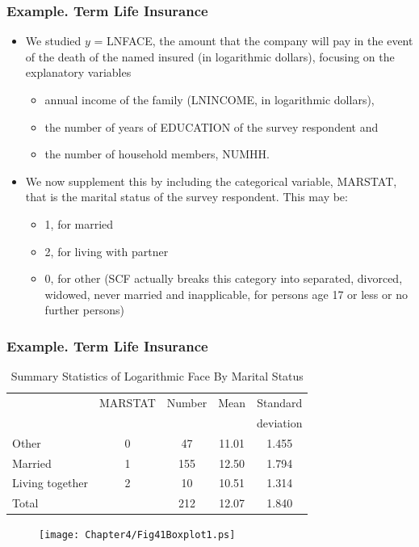 \begin{frame}
 \frametitle{Example. Term Life Insurance}
 \begin{itemize}
   \item We studied $y$ = LNFACE, the amount that the company will pay in the event
of the death of the named insured (in logarithmic dollars), focusing
on the explanatory variables
 \begin{itemize}
 \item
annual income of the family (LNINCOME, in logarithmic dollars),
 \item the number of years of EDUCATION of the
survey respondent and
 \item the number of household members, NUMHH.
 \end{itemize}
\item We now supplement this by including the categorical variable,
MARSTAT, that is the marital status of the survey respondent. This
may be:
\begin{itemize}
 \item 1, for married
 \item 2, for living with partner
 \item 0, for other (SCF actually breaks this category into
 separated, divorced, widowed, never married and inapplicable, for
 persons age 17 or less or no further persons)
 \end{itemize}

 \end{itemize}
\end{frame}


\begin{frame}[shrink=10]
 \frametitle{Example. Term Life Insurance}
  \begin{center}  \begin{table}[h] \caption{Summary
Statistics of Logarithmic Face By Marital Status}
\begin{tabular}{lcccc}
\hline
& MARSTAT & Number & Mean & Standard \\
&  &  &  & deviation \\ \hline
Other           & 0 & 47 & 11.01 & 1.455 \\
Married         & 1 & 155 & 12.50 & 1.794 \\
Living together & 2 & 10 & 10.51 & 1.314 \\ \hline
Total           &   & 212 & 12.07 & 1.840 \\
 \hline
\end{tabular}
\end{table}  \end{center}  
\begin{figure}[htp]
  \begin{center}
    \texttt{[image: Chapter4/Fig41Boxplot1.ps]}
  \end{center}
\end{figure}

\end{frame}

